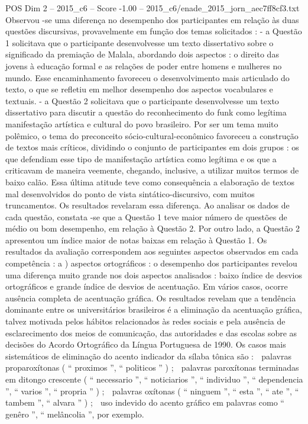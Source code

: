 \begin{textsample}{POS Dim 2 – 2015\_c6 – Score -1.00 – 2015\_c6/enade\_2015\_jorn\_aec7ff8cf3.txt}
Observou -se uma diferença no desempenho dos participantes em relação às duas questões discursivas, provavelmente em função dos temas solicitados : - a Questão 1 solicitava que o participante desenvolvesse um texto dissertativo sobre o significado da premiação de Malala, abordando dois aspectos : o direito das jovens à educação formal e as relações de poder entre homens e mulheres no mundo.
Esse encaminhamento favoreceu o desenvolvimento mais articulado do texto, o que se refletiu em melhor desempenho dos aspectos vocabulares e textuais. - a Questão 2 solicitava que o participante desenvolvesse um texto dissertativo para discutir a questão do reconhecimento do funk como legítima manifestação artística e cultural do povo brasileiro.
Por ser um tema muito polêmico, o tema do preconceito sócio-cultural-econômico favoreceu a construção de textos mais críticos, dividindo o conjunto de participantes em dois grupos : os que defendiam esse tipo de manifestação artística como legítima e os que a criticavam de maneira veemente, chegando, inclusive, a utilizar muitos termos de baixo calão.
Essa última atitude teve como consequência a elaboração de textos mal desenvolvidos do ponto de vista sintático-discursivo, com muitos truncamentos.
Os resultados revelaram essa diferença.
Ao analisar os dados de cada questão, constata -se que a Questão 1 teve maior número de questões de médio ou bom desempenho, em relação à Questão 2.
Por outro lado, a Questão 2 apresentou um índice maior de notas baixas em relação à Questão 1.
Os resultados da avaliação correspondem aos seguintes aspectos observados em cada competência : a ) aspectos ortográficos : o desempenho dos participantes revelou uma diferença muito grande nos dois aspectos analisados : baixo índice de desvios ortográficos e grande índice de desvios de acentuação.
Em vários casos, ocorre ausência completa de acentuação gráfica.
Os resultados revelam que a tendência dominante entre os universitários brasileiros é a eliminação da acentuação gráfica, talvez motivada pelos hábitos relacionados às redes sociais e pela ausência de esclarecimento dos meios de comunicação, das autoridades e das escolas sobre as decisões do Acordo Ortográfico da Língua Portuguesa de 1990.
Os casos mais sistemáticos de eliminação do acento indicador da sílaba tônica são :  palavras proparoxítonas ( “ proximos ”, “ politicos ” ) ;  palavras paroxítonas terminadas em ditongo crescente ( “ necessario ”, “ noticiarios ”, “ individuo ”, “ dependencia ”, “ varios ”, “ propria ” ) ;  palavras oxítonas ( “ ninguem ”, “ esta ”, “ ate ”, “ tambem ”, “ alvara ” ) ;  uso indevido do acento gráfico em palavras como “ genêro ”, “ melâncolia ”, por exemplo.

\end{textsample}
